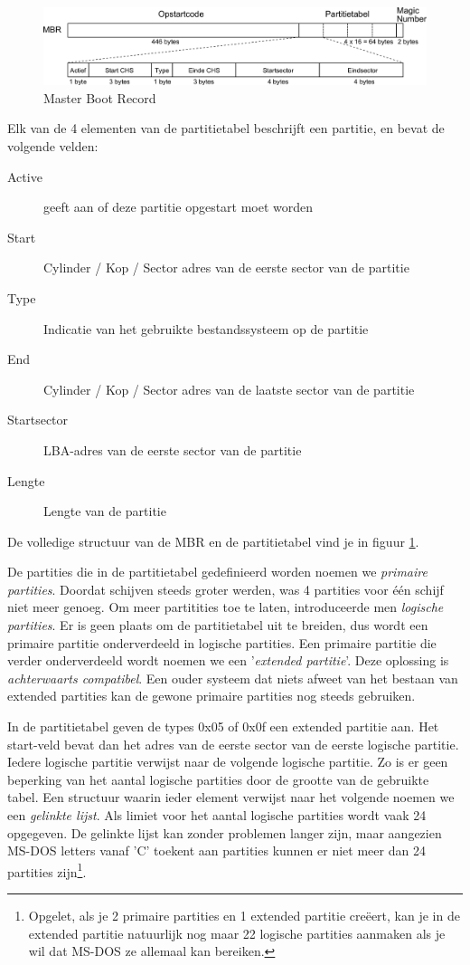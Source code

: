 \begin{figure}
\begin{center}
\includegraphics[width=125mm]{images/fig0206.png}
\end{center}
\caption{Master Boot Record}
\label{mbr}
\end{figure}

Elk van de 4 elementen van de partitietabel beschrijft een
partitie, en bevat de volgende velden:

\begin{description}
\item[Active] geeft aan of deze partitie opgestart moet worden
\item[Start] Cylinder / Kop / Sector adres van de eerste sector van de partitie
\item[Type] Indicatie van het gebruikte bestandssysteem op de partitie
\item[End] Cylinder / Kop / Sector adres van de laatste sector van de partitie
\item[Startsector] LBA-adres van de eerste sector van de partitie
\item[Lengte] Lengte van de partitie
\end{description}

De volledige structuur van de MBR en de partitietabel vind je in figuur
\ref{mbr}.

De partities die in de partitietabel gedefinieerd worden noemen
we \emph{primaire partities}. Doordat schijven steeds
groter werden, was 4 partities voor \'e\'en schijf niet meer genoeg. Om
meer partitities toe te laten, introduceerde men \emph{logische
partities}. Er is geen plaats om de partitietabel uit te
breiden, dus wordt een primaire partitie onderverdeeld in logische
partities. Een primaire partitie die verder onderverdeeld wordt noemen
we een '\emph{extended partitie}'. Deze oplossing is
\emph{achterwaarts compatibel}. Een ouder systeem dat
niets afweet van het bestaan van extended partities kan de gewone
primaire partities nog steeds gebruiken.

In de partitietabel geven de types 0x05 of 0x0f een extended
partitie aan. Het start-veld bevat dan het adres van de eerste sector
van de eerste logische partitie. Iedere logische partitie verwijst
naar de volgende logische partitie. Zo is er geen beperking van het
aantal logische partities door de grootte van de gebruikte tabel. Een
structuur waarin ieder element verwijst naar het volgende noemen we
een \emph{gelinkte lijst}. Als limiet voor het aantal
logische partities wordt vaak 24 opgegeven. De gelinkte lijst kan
zonder problemen langer zijn, maar aangezien MS-DOS letters vanaf 'C'
toekent aan partities kunnen er niet meer dan 24 partities
zijn\footnote{Opgelet, als je 2 primaire partities en 1 extended partitie
cre\"eert, kan je in de extended partitie natuurlijk nog maar 22 logische
partities aanmaken als je wil dat MS-DOS ze allemaal kan bereiken.}.

